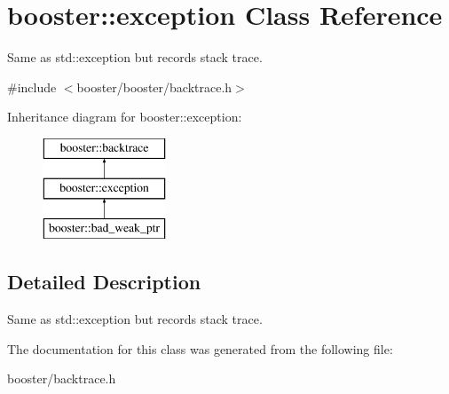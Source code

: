 \section{booster\-:\-:exception \-Class \-Reference}
\label{classbooster_1_1exception}


\-Same as std\-::exception but records stack trace.  




{\ttfamily \#include $<$booster/booster/backtrace.\-h$>$}

\-Inheritance diagram for booster\-:\-:exception\-:\begin{figure}[H]
\begin{center}
\leavevmode
\includegraphics[height=3.000000cm]{classbooster_1_1exception}
\end{center}
\end{figure}


\subsection{\-Detailed \-Description}
\-Same as std\-::exception but records stack trace. 

\-The documentation for this class was generated from the following file\-:\begin{DoxyCompactItemize}
\item 
booster/backtrace.\-h\end{DoxyCompactItemize}
